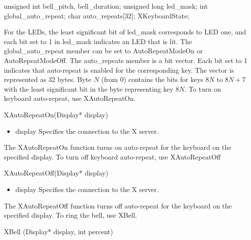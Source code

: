 \documentclass{report}
\begin{document}
\begin{itemize}
\begin{itemize}
\begin{cppcode}
{                    unsigned int bell_pitch, bell_duration;
                    unsigned long led_mask;
                    int global_auto_repeat;
                    char auto_repeats[32];
                } XKeyboardState;  
            \end{cppcode}
            \bigbreak \noindent 
            For the LEDs, the least significant bit of led\_mask corresponds to LED one, and each bit set to 1 in led\_mask indicates an LED that is lit. The global\_auto\_repeat member can be set to AutoRepeatModeOn or AutoRepeatModeOff. The auto\_repeats member is a bit vector. Each bit set to 1 indicates that auto-repeat is enabled for the corresponding key. The vector is represented as 32 bytes. Byte $N$ (from 0) contains the bits for keys $8N$ to $8N + 7$ with the least significant bit in the byte representing key $8N$.
            \bigbreak \noindent 
            To turn on keyboard auto-repeat, use XAutoRepeatOn.
            \bigbreak \noindent 
            \begin{cppcode}
                XAutoRepeatOn(Display* display)
            \end{cppcode}
            \bigbreak \noindent
            \begin{itemize}
                \item display Specifies the connection to the X server.
            \end{itemize}
            The XAutoRepeatOn function turns on auto-repeat for the keyboard on the specified display.
            \bigbreak \noindent 
            To turn off keyboard auto-repeat, use XAutoRepeatOff
            \bigbreak \noindent 
            \begin{cppcode}
                XAutoRepeatOff(Display* display)
            \end{cppcode}
            \bigbreak \noindent
            \begin{itemize}
                \item display Specifies the connection to the X server.
            \end{itemize}
            The XAutoRepeatOff function turns off auto-repeat for the keyboard on the specified display.
            \bigbreak \noindent 
            To ring the bell, use XBell.
            \bigbreak \noindent 
            \begin{cppcode}
            XBell (Display* display, int percent)
            \end{cppcode}
            \bigbreak \noindent
            \begin{itemize}

\end{itemize}
\end{itemize}
\end{itemize}
\end{document}
